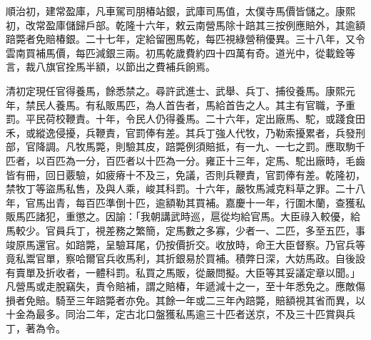 \begin{pinyinscope}
順治初，建常盈庫，凡車駕司朋椿站銀，武庫司馬值，太僕寺馬價皆儲之。康熙初，改常盈庫儲歸戶部。乾隆十六年，敕云南營馬除十踣其三按例應賠外，其逾額踣斃者免賠椿銀。二十七年，定給留圈馬乾，每匹視綠營稍優異。三十八年，又令雲南買補馬價，每匹減銀三兩。初馬乾歲費約四十四萬有奇。道光中，從載銓等言，裁八旗官拴馬半額，以節出之費補兵餉焉。

清初定現任官得養馬，餘悉禁之。尋許武進士、武舉、兵丁、捕役養馬。康熙元年，禁民人養馬。有私販馬匹，為人首告者，馬給首告之人。其主有官職，予重罰。平民荷校鞭責。十年，令民人仍得養馬。二十六年，定出廠馬、駝，或踐食田禾，或縱逸侵擾，兵鞭責，官罰俸有差。其兵丁強人代牧，乃勒索擾累者，兵發刑部，官降調。凡牧馬斃，則驗其皮，踣斃例須賠抵，有一九、一七之罰。應取駒千匹者，以百匹為一分，百匹者以十匹為一分。雍正十三年，定馬、駝出廠時，毛齒皆有冊，回日覈驗，如疲瘠十不及三，免議，否則兵鞭責，官罰俸有差。乾隆初，禁牧丁等盜馬私售，及與人乘，峻其科罰。十六年，嚴牧馬減克料草之罪。二十八年，官馬出青，每百匹準倒十匹，逾額勒其買補。嘉慶十一年，行圍木蘭，查獲私販馬匹諸犯，重懲之。因諭：「我朝講武時巡，扈從均給官馬。大臣祿入較優，給馬較少。官員兵丁，視差務之繁簡，定馬數之多寡，少者一、二匹，多至五匹，事竣原馬還官。如踣斃，呈驗耳尾，仍按價折交。收放時，命王大臣督察。乃官兵等竟私鬻官單，察哈爾官兵收馬利，其折銀易於買補。積弊日深，大妨馬政。自後設有賣單及折收者，一體科罰。私買之馬販，從嚴問擬。大臣等其妥議定章以聞。」凡營馬或走脫竊失，責令賠補，謂之賠椿，年遞減十之一，至十年悉免之。應敵傷損者免賠。騎至三年踣斃者亦免。其餘一年或二三年內踣斃，賠額視其省而異，以十金為最多。同治二年，定古北口盤獲私馬逾三十匹者送京，不及三十匹賞與兵丁，著為令。


\end{pinyinscope}